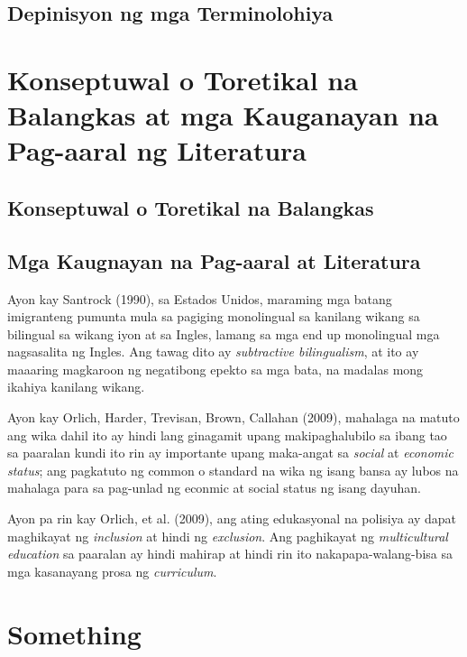 \documentclass [11pt] {report}
\begin{document}
\section{Depinisyon ng mga Terminolohiya}

\chapter{Konseptuwal o Toretikal na Balangkas at mga Kauganayan na Pag-aaral ng Literatura}
\section {Konseptuwal o Toretikal na Balangkas}
\pagebreak
\section {Mga Kaugnayan na Pag-aaral at Literatura}
Ayon kay Santrock (1990), sa Estados Unidos, maraming mga batang imigranteng
pumunta mula sa pagiging monolingual sa kanilang wikang sa bilingual sa wikang
iyon at sa Ingles, lamang sa mga end up monolingual mga nagsasalita ng Ingles.
Ang tawag dito ay \emph{subtractive bilingualism}, at ito ay maaaring magkaroon
ng negatibong epekto sa mga bata, na madalas mong ikahiya kanilang wikang.

Ayon kay Orlich, Harder, Trevisan, Brown, Callahan (2009), mahalaga na matuto ang
wika dahil ito ay hindi lang ginagamit upang makipaghalubilo sa ibang tao sa
paaralan kundi ito rin ay importante upang maka-angat sa \emph{social} at
\emph{economic status}; ang pagkatuto ng common o standard na wika ng isang
bansa ay lubos na mahalaga para sa pag-unlad ng econmic at social status ng
isang dayuhan.

Ayon pa rin kay Orlich, et al. (2009), ang ating edukasyonal na polisiya ay
dapat maghikayat ng \emph{inclusion} at hindi ng \emph{exclusion}. Ang
paghikayat ng \emph{multicultural education} sa paaralan ay hindi mahirap at
hindi rin ito nakapapa-walang-bisa sa mga kasanayang prosa ng \emph{curriculum}.

\chapter{Something}

\end{document}
